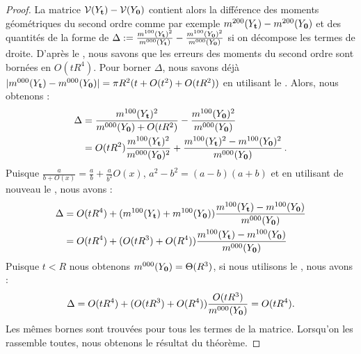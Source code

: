 \begin{proof}
  La matrice $\mathcal{V}( Y_{\mathbf{t}} ) - \mathcal{V}(Y_{\mathbf{0}})$ contient alors la
  différence des moments géométriques du second ordre comme par exemple $
  m^{200}(Y_{\mathbf{t}}) - m^{200}(Y_{\mathbf{0}})$ et des quantités de la forme
  de $\Delta := \frac{m^{100}(Y_{\mathbf{t}})^2}{m^{000}(Y_{\mathbf{t}})} -
  \frac{m^{100}(Y_{\mathbf{0}})^2}{m^{000}(Y_{\mathbf{0}})}$ si on décompose
  les termes de droite. D'après le ,
  nous savons que les erreurs des moments du second ordre sont bornées en $O(t
  R^4)$. Pour borner $\Delta$, nous savons déjà $|m^{000}(Y_{\mathbf{t}}) -
  m^{000}(Y_{\mathbf{0}})| = \pi R^2(t+O(t^2)+O(tR^2))$ en utilisant le
  . Alors, nous obtenons :
  \begin{align}
    \Delta &= \frac{m^{100}(Y_{\mathbf{t}})^2}{m^{000}(Y_{\mathbf{0}}) + O(tR^2)} -
    \frac{m^{100}(Y_{\mathbf{0}})^2}{m^{000}(Y_{\mathbf{0}})}\\
    &= O(tR^2)\frac{m^{100}(Y_{\mathbf{t}})^2}{m^{000}(Y_{\mathbf{0}})^2} +
    \frac{m^{100}(Y_{\mathbf{t}})^2 - m^{100}(Y_{\mathbf{0}})^2}{m^{000}(Y_{\mathbf{0}})}\,.
  \end{align}
  Puisque $\frac{a}{b+O(x)}=\frac{a}{b}+\frac{a}{b^2}O(x)$, $a^2-b^2=(a-b)(a+b)$
  et en utilisant de nouveau le , nous
  avons :
  \begin{align*}
    \Delta
    &= O(tR^4) + (m^{100}(Y_{\mathbf{t}}) + m^{100}(Y_{\mathbf{0}}))\frac{m^{100}(Y_{\mathbf{t}}) - m^{100}(Y_{\mathbf{0}})}{m^{000}(Y_{\mathbf{0}})} \\
    &= O(tR^4) + (O(tR^3)+O(R^4))\frac{m^{100}(Y_{\mathbf{t}}) - m^{100}(Y_{\mathbf{0}})}{m^{000}(Y_{\mathbf{0}})}
  \end{align*}
  Puisque $t < R$ nous obtenons $m^{000}(Y_{\mathbf{0}}) = \Theta(R^3)$, si nous
  utilisons le , nous avons :
  \begin{equation}
    \Delta = O(tR^4) + (O(tR^3)+O(R^4))\frac{O(tR^3)}{m^{000}(Y_{\mathbf{0}})} = O(tR^4).
  \end{equation}
  Les mêmes bornes sont trouvées pour tous les termes de la matrice. Lorsqu'on
  les rassemble toutes, nous obtenons le résultat du théorème.
  \end{proof}

